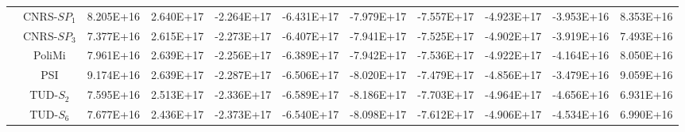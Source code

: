 \begin{table}[htbp!]
\begin{tabular}{c c c c c c c c c c c}
		& CNRS-$SP_1$ & 8.205E+16 & 2.640E+17 & -2.264E+17 & -6.431E+17 & -7.979E+17 & -7.557E+17 & -4.923E+17 & -3.953E+16 & 8.353E+16 \\
        & CNRS-$SP_3$ & 7.377E+16 & 2.615E+17 & -2.273E+17 & -6.407E+17 & -7.941E+17 & -7.525E+17 & -4.902E+17 & -3.919E+16 & 7.493E+16 \\
        & PoliMi & 7.961E+16 & 2.639E+17 & -2.256E+17 & -6.389E+17 & -7.942E+17 & -7.536E+17 & -4.922E+17 & -4.164E+16 & 8.050E+16 \\
        & PSI & 9.174E+16 & 2.639E+17 & -2.287E+17 & -6.506E+17 & -8.020E+17 & -7.479E+17 & -4.856E+17 & -3.479E+16 & 9.059E+16 \\
        & TUD-$S_2$ & 7.595E+16 & 2.513E+17 & -2.336E+17 & -6.589E+17 & -8.186E+17 & -7.703E+17 & -4.964E+17 & -4.656E+16 & 6.931E+16 \\
        & TUD-$S_6$ & 7.677E+16 & 2.436E+17 & -2.373E+17 & -6.540E+17 & -8.098E+17 & -7.612E+17 & -4.906E+17 & -4.534E+16 & 6.990E+16 \\
		\bottomrule
	\end{tabular}
\end{table}

